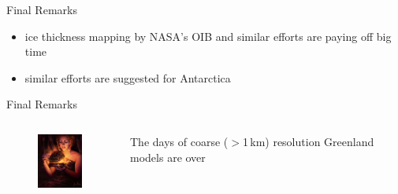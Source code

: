 \documentclass[hide notes,intlimits]{beamer}
\begin{document}
\begin{frame}{Final Remarks}
  \begin{itemize}
    \item ice thickness mapping by NASA's OIB and similar efforts are paying off big time
    \item similar efforts are suggested for Antarctica
  \end{itemize}
\end{frame}


\begin{frame}{Final Remarks}
\begin{columns}
  \column[c]{3cm}
  \begin{figure}
    \includegraphics[width=1.75cm]{pandoras-box}
  \end{figure}
  \column[c]{8cm}
  The days of coarse ($>$1\,km) resolution Greenland models are over
\end{columns}
\end{frame}
\end{document}
